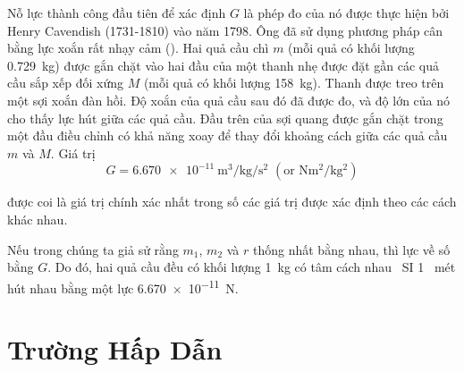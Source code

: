 Nỗ lực thành công đầu tiên để xác định $G$ là phép đo của nó được thực hiện bởi Henry Cavendish (1731-1810) vào năm 1798. Ông đã sử dụng phương pháp cân bằng lực xoắn rất nhạy cảm (). Hai quả cầu chì $m$ (mỗi quả có khối lượng \SI{0.729}{\kilo\gram}) được gắn chặt vào hai đầu của một thanh nhẹ được đặt gần các quả cầu sắp xếp đối xứng $M$ (mỗi quả có khối lượng \SI{158}{\kilo\gram}). Thanh được treo trên một sợi xoắn đàn hồi. Độ xoắn của quả cầu sau đó đã được đo, và độ lớn của nó cho thấy lực hút giữa các quả cầu. Đầu trên của sợi quang được gắn chặt trong một đầu điều chỉnh có khả năng xoay để thay đổi khoảng cách giữa các quả cầu $m$ và $M$. Giá trị
\begin{equation*}
	G = \SI{6.670e-11}{\metre\cubed\per\kilo\gram\per\second\squared}\,\,(\text{or}\,\, \si{\newton\metre\squared\per\kilo\gram\squared})
\end{equation*}

\noindent
được coi là giá trị chính xác nhất trong số các giá trị được xác định theo các cách khác nhau.

Nếu trong  chúng ta giả sử rằng $m_1$, $m_2$ và $r$ thống nhất bằng nhau, thì lực về số bằng $G$. Do đó, hai quả cầu đều có khối lượng \SI{1}{\kilo\gram} có tâm cách nhau \ SI {1} {\ mét} hút nhau bằng một lực \SI{6.670e-11}{\newton}.

\section{Trường Hấp Dẫn}\label{sec:6_2}


